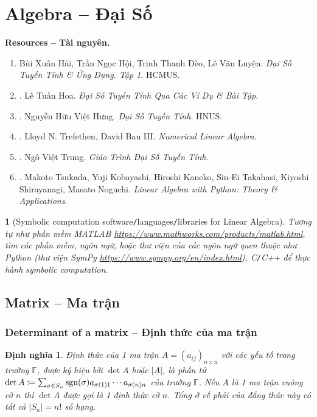 \documentclass{article}
\newtheorem{baitoan}{}
\newtheorem{dinhnghia}{Định nghĩa}
\begin{document}
\section{Algebra -- Đại Số}
\textbf{\textsf{Resources -- Tài nguyên.}}
\begin{enumerate}
	\item {\sc Bùi Xuân Hải, Trần Ngọc Hội, Trịnh Thanh Đèo, Lê Văn Luyện}. {\it Đại Số Tuyến Tính \& Ứng Dụng. Tập 1}. HCMUS.
	\item \cite{Hoa_linear_algebra}. {\sc Lê Tuấn Hoa}. {\it Đại Số Tuyến Tính Qua Các Ví Dụ \& Bài Tập}.
	\item \cite{Hung_linear_algebra}. {\sc Nguyễn Hữu Việt Hưng}. {\it Đại Số Tuyến Tính}. HNUS.
	\item \cite{Trefethen_Bau1997,Trefethen_Bau2022}. {\sc Lloyd N. Trefethen, David Bau III}. {\it Numerical Linear Algebra}.
	\item \cite{Trung_linear_algebra}. {\sc Ngô Việt Trung}. {\it Giáo Trình Đại Số Tuyến Tính}.
	\item \cite{Tsukada_Kobayashi_Kaneko_Takahasi_Shirayanagi_Noguchi2023}. {\sc Makoto Tsukada, Yuji Kobayashi, Hiroshi Kaneko, Sin-Ei Takahasi, Kiyoshi Shirayanagi, Masato Noguchi}. {\it Linear Algebra with Python: Theory \& Applications}.
\end{enumerate}

\begin{baitoan}[Symbolic computation software{\tt/}languages{\tt/}libraries for Linear Algebra]
	Tương tự như phần mềm {\sf MATLAB} \url{https://www.mathworks.com/products/matlab.html}, tìm các phần mềm, ngôn ngữ, hoặc thư viện của các ngôn ngữ quen thuộc như {\sf Python} (thư viện {\sf SymPy} \url{https://www.sympy.org/en/index.html}), {\sf C{\tt/}C++} để thực hành symbolic computation.
\end{baitoan}

\subsection{Matrix -- Ma trận}

\subsubsection{Determinant of a matrix -- Định thức của ma trận}
\begin{dinhnghia}
	{\rm Định thức} của 1 ma trận $A = (a_{ij})_{n\times n}$ với các yếu tố trong trường $\mathbb{F}$, được ký hiệu bởi $\det A$ hoặc $|A|$, là phần tử $\det A\coloneqq\sum_{\sigma\in S_n} {\rm sgn}(\sigma)a_{\sigma(1)1}\cdots a_{\sigma(n)n}$ của trường $\mathbb{F}$. Nếu $A$ là 1 ma trận vuông cỡ $n$ thì $\det A$ được gọi là 1 {\rm định thức cỡ $n$}. Tổng ở vế phải của đẳng thức này có tất cả $|S_n| = n!$ số hạng.
\end{dinhnghia}
\end{document}
